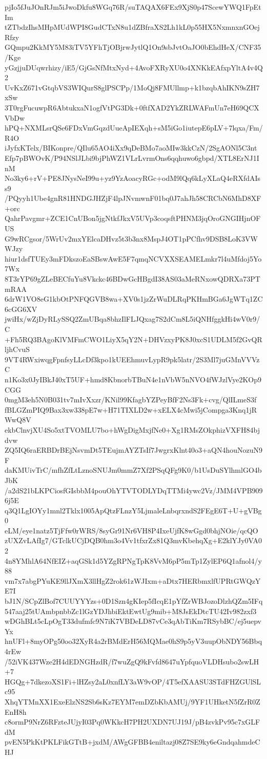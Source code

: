 pjIo5fJuJOnRJm5iJwoDkfu8WGq76R/suTAQAX6FEx9XjS0p47ScewYWQ1FpEtIm
tZTbdzIhsMHpMUdWPI8GudCTxN8u1dZBfraXS2Lh1kL0p55HX5NxmnxnGOejRfzy
GQmpu2KkMY5M83iTV5YFhTjOBjrwJytlQ1On9sbJvtOaJO0bEhdHeX/CNF35/Kge
yGzjjuDUqwrhizy/iE5/GjGsNfMtxNyd+4AvoFXRyXU0o4XNKkEAfxpYltA4v4Q2
UvKxZ671vGtqbVS3WIQurS8glPSCPp/1MoQj8FMUllmp+k1bzqbAhIKN9sZH7xSw
3T0rgFucuwpR6AbtukxaN1ogfVtPG3Dk+0ftfXAD2YkZRLWAFmUn7eH69QCXVbDw
hPQ+NXMLsrQSe6FDxVmGqzdUueApIEXqh+sM5iGo1iutepE6pLV+7lqxa/Fm/R4O
iJyfxKTelx/BIKonpre/QIlu65AO4iXx9qDeBMo7aoMIw3kkCzN/2SgAONl5C3nt
Efp7pBWOvK/P94NSlJLbi9bjPhWZ1VLrLvrmOns6qqhuwo6gbpd/XTL8ErNJ1InM
No3ky6+rV+PE8JNysNeI99u+yz9YzAoacyRGc+odM9lQq6kLyXLaQ4eRXfdAIss9
/PQyyh1Ube4gnR81HNDGJHZjF4lpJNvmwnF01bq0J7ahJh58CRCbN6MhD8XF+orc
QahrPavgmr+ZCE1CnUBon5jgNtkfJkxV5UVp3coqsftPHNM3jqOroGNGIHjnOFUS
G9wRCgsor/5WrUv2mxYElcaDHvz5t3b3nx8MspJ4OT1pPCfhv9DSB8LoK3VWWJzy
hiur1dsfTUEy3mFDkszoEaSBswAwE5F7qmqNCVXXSEAMELmkr7l4uMfdoj5Yo7Wx
8T3rYP69gZLeBECfuYu8Vkckc46BDwGcHBgdI38AS03aMeRNxowQDRXa73PTmRAA
6drW1VO8eG1kbOtPNFQGVB8wa+XV0s1jzZrWuDLRqPKHmBGa6JgWTq1ZC6cGG6XV
jwiHx/wZjDyRLySSQ2ZmUBqa8bhzIlFLJQxag7S2dCm8L5iQNHfggkHi4wV0r9/C
+Fh5RQ3BAgoKlVMFmCWO1LiyX5qY2N+DHVzxyPK8J0xcS1UDLM5f2GvQRljhCvuS
9VT4RWxiwqgFpnfsyLLcDf3kpo1kUEEhmuvLypR9pk5latr/2S3Ml7juGMnVVVzC
n1Ko3x0JyIBkJ40xT5UF+hmd8KbnorbTBuN4e1nVbW5nNVO4fWJzlVye2KOp9CGG
0mgM3eh5N0B031tv7mIvXxzr/KNil99KfagbYZPeyBfF2Ns3Fk+cvg/QlILmeS3f
fBLGZmPIQ9Bax3xw338pE7w+H71TIXLD2w+xELX4cMwi5jCompga3Knq1jRWwQ8V
ekbClnvjXU4So5xtTVOMLU7bo+hWgDigMxjfNe0+Xg1RMsZOkphizVXFH84bjdvw
ZQ5IQ6raERBDrBEjNsvmDt5TEujmAYZTsIf7JwgrxKlnt40o3+aQN4houNozuN9F
daKMUivTrC/mfhZfLtLznoSNUJm0mmZ7Xf2PSqQFg9K0/b1UsDuSYlhmlGO4bJbK
/a2dS21bLKPCiosfGIsbbM4pouOhYTVTODLYDqTTMi4ywc2Vz/JMM4VPB9096j5E
q3Q1LgIOYy1mnl2Tklx1005ApQtzFLnzY5LjmaleLnbqrxndS2FEgE6T+U+gVBg0
eLM/eye1natz5TjFfw0rWRS/8syGr91Nr6VH8P4IxeUjfK8wGgd0bhjNOie/qcQO
zUXZvLAfIg7/GTclkUCjDQB0hm3o4Vv1tfxrZx81Q3mvKbehqXg+E2klYJy0VA02
4n8YMhlA64NfEIZ+aqGSk1d5YZgRPNgTpK8VvM6pP5mTp1ZylEP6Q1afnol4/y88
vm7x7abgPYuKE9llJXmX3llHgZ2rok61zWJIxm+aDtx7HERbmxlfUPRtGWQzYE7I
bJ1N/SCpZlBof7CUUYYYzs+0D1Szn4gKIep5fIcqE1pYfZrWBJozoDlzhQZm5IFq
547aaj25tUAmbpnbbZc1lGzYDJhbiEktEwtUg9mib+M8JsEkDtcTU42Iv982zxf3
wDGhBLt5cLpOgT33dufmfc9N7iK7VBDeLD87vCe3qAbTiKm7RSybBC/ej5uepvYx
hnUFl+8myOPg50oo32XyR4a2rBMdErH56MQMae0hS9p5yV3uupObNDY56Bbq4rEw
/52iVK437Wze2H4dEDNGHzdR/f7wuZgQ9kFvfd8647uYpfquoVLDHsubo2swLH+7
HGQg+7dkezoXS1Fi+lHZsy2aL0xnfLY3aW9vOP/4T5efXAASU3STdFHZGUlSLc95
XhqYTMnXX1ExeElzNS2Sb6sKz7EYM7emDZbKbAMUj/9YF1UHketN5fZrR0ZEnH8h
c8ormP9NrZ6RFzteJUjyI03Pq0WKkcH7PH2UXDN7UJ19J/pB4zvkPv95c7xGLFdM
pvEN5PkKtPKLFikGTtB+jxdM/AWgGFBB4eniltazj08Z7SE9ky6eGndqahmdeCHJ
